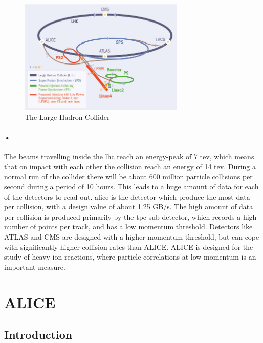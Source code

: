 \documentclass[a4paper]{report}
\begin{document}
\begin{figure}[h!]
  \centering
    \includegraphics[width=0.7\textwidth]{images/lhc-ring.jpg}
     \caption{The Large Hadron Collider}
    \label{fig:lhc}
\end{figure}

\paragraph{•}
The beams travelling inside the \gls{lhc} reach an energy-peak of 7 \gls{tev}, which means that on impact with each other the collision reach an energy of 14 \gls{tev}.\cite{lhc-pdf}
During a normal run of the collider there will be about 600 million particle collisions per second during a period of 10 hours.
This leads to a huge amount of data for each of the detectors to read out.
\gls{alice} is the detector which produce the most data per collision, with a design value of about 1.25 GB/s.
The high amount of data per collision is produced primarily by the \gls{tpc} sub-detector, which records a high number of points per track, and has a low momentum threshold. Detectors like ATLAS and CMS  are designed with a higher momentum threshold, but can cope with significantly higher collision rates than ALICE. ALICE is designed for the study of heavy ion reactions, where particle correlations at low momentum is an important measure.

\section{ALICE}
\subsection{Introduction}
\end{document}
